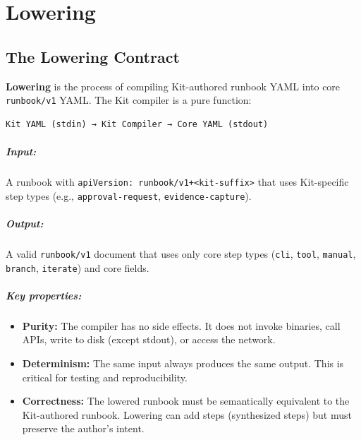 
\chapter{Lowering}
\label{ch:lowering}

\section{The Lowering Contract}
\label{sec:lowering-contract}

\textbf{Lowering} is the process of compiling Kit-authored runbook YAML into
core \texttt{runbook/v1} YAML. The Kit compiler is a pure function:

\begin{verbatim}
Kit YAML (stdin) → Kit Compiler → Core YAML (stdout)
\end{verbatim}

\paragraph{Input:} A runbook with \texttt{apiVersion: runbook/v1+<kit-suffix>}
that uses Kit-specific step types (e.g., \texttt{approval-request},
\texttt{evidence-capture}).

\paragraph{Output:} A valid \texttt{runbook/v1} document that uses only core
step types (\texttt{cli}, \texttt{tool}, \texttt{manual}, \texttt{branch},
\texttt{iterate}) and core fields.

\paragraph{Key properties:}

\begin{itemize}
  \item \textbf{Purity:} The compiler has no side effects. It does not invoke
    binaries, call APIs, write to disk (except stdout), or access the network.
  \item \textbf{Determinism:} The same input always produces the same output.
    This is critical for testing and reproducibility.
  \item \textbf{Correctness:} The lowered runbook must be semantically
    equivalent to the Kit-authored runbook. Lowering can add steps
    (synthesized steps) but must preserve the author's intent.
\end{itemize}

